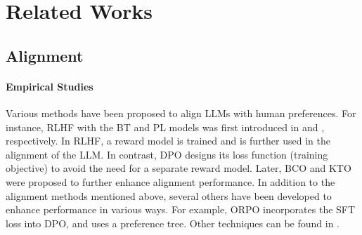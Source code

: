 \section{Related Works}
\subsection{Alignment}
\paragraph{Empirical Studies} Various methods have been proposed to align LLMs with human preferences. For instance, RLHF with the BT and PL models was first introduced in \cite{ziegler2019fine} and \cite{ouyang2022training}, respectively. In RLHF, a reward model is trained and is further used in the alignment of the LLM. In contrast, DPO \cite{rafailov2024direct} designs its loss function (training objective) to avoid the need for a separate reward model. Later, BCO \cite{jung2024binary} and KTO \cite{ethayarajh2024kto} were proposed to further enhance alignment performance. In addition to the alignment methods mentioned above, several others have been developed to enhance performance in various ways. For example, ORPO \cite{hong2024orpo} incorporates the SFT loss into DPO, and \cite{yuan2024advancing} uses a preference tree. Other techniques can be found in \cite{xiong2024building,amini2024direct,lu2024online,wang2024bpo,zhou2024t,zhang2024self, franken2024self,yin2024entropy}.




